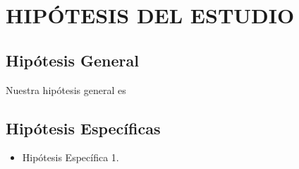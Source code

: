 \section{HIPÓTESIS DEL ESTUDIO}
\subsection{Hipótesis General}

Nuestra hipótesis general es 

\subsection{Hipótesis Específicas}
\begin{itemize}
	\item Hipótesis Específica 1.
\end{itemize}